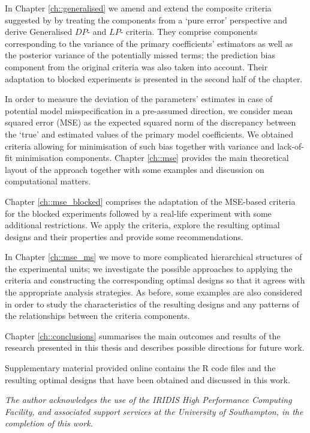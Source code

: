 In Chapter \ref{ch::generalised} we amend and extend the composite criteria suggested by \cite{Goos2005model} by treating the components from a `pure error' perspective and derive Generalised $DP$- and $LP$- criteria. They comprise components corresponding to the variance of the primary coefficients' estimators as well as the posterior variance of the potentially missed terms; the prediction bias component from the original criteria was also taken into account. Their adaptation to blocked experiments is presented in the second half of the chapter.  

In order to measure the deviation of the parameters' estimates in case of potential model misspecification in a pre-assumed direction, we consider mean squared error (MSE) as the expected squared norm of the discrepancy between the `true' and estimated values of the primary model coefficients. We obtained criteria allowing for minimisation of such bias together with variance and lack-of-fit minimisation components. Chapter \ref{ch::mse} provides the main theoretical layout of the approach together with some examples and discussion on computational matters.

Chapter \ref{ch::mse_blocked} comprises the adaptation of the MSE-based criteria for the blocked experiments followed by a real-life experiment with some additional restrictions. We apply the criteria, explore the resulting optimal designs and their properties and provide some recommendations. 

In Chapter \ref{ch::mse_ms} we move to more complicated hierarchical structures of the experimental units; we investigate the possible approaches to applying the criteria and constructing the corresponding optimal designs so that it agrees with the appropriate analysis strategies. As before, some examples are also considered in order to study the characteristics of the resulting designs and any patterns of the relationships between the criteria components.

Chapter \ref{ch::conclusions} summarises the main outcomes and results of the research presented in this thesis and describes possible directions for future work.

Supplementary material provided online contains the R code files and the resulting optimal designs that have been obtained and discussed in this work.

\vspace*{\fill}
\textit{The author acknowledges the use of the IRIDIS High Performance Computing Facility, and associated support services at the University of Southampton, in the completion of this work. }














      